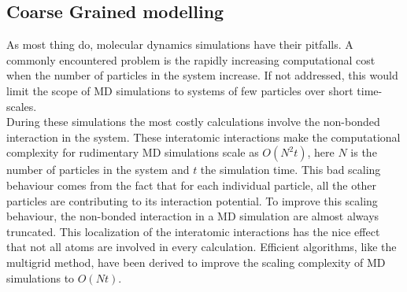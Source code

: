 %

\subsection{Coarse Grained modelling}
As most thing do, molecular dynamics simulations have their pitfalls. A commonly
encountered problem is the rapidly increasing computational cost when the number of
particles in the system increase. If not addressed, this would limit the scope of MD
simulations to systems of few particles over short time-scales.\\

During these simulations the most costly calculations involve the non-bonded
interaction in the system. These interatomic interactions make the computational
complexity for rudimentary MD simulations scale as $O(N^2t)$, here $N$ is the number of
particles in the system and $t$ the simulation time. This bad scaling behaviour comes
from the fact that for each individual particle, all the other particles are contributing
to its interaction potential. To improve this scaling behaviour, the non-bonded
interaction in a MD simulation are almost always truncated. This localization of the
interatomic interactions has the nice effect that not all atoms are involved in every
calculation. Efficient algorithms, like the multigrid method, have been derived to
improve the scaling complexity of MD simulations to $O(Nt)$.\\

